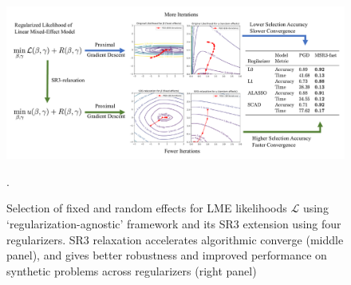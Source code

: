 \begin{figure}[ht!]
    \centering
    \includegraphics[width=\textwidth]{figures/summary_picture.pdf}
    \caption{Selection of fixed and random effects for LME likelihoods $\mathcal{L}$ using 
    `regularization-agnostic' framework and its SR3 extension using four regularizers. 
    SR3 relaxation accelerates algorithmic converge  (middle panel), and gives better robustness and improved performance on synthetic problems across regularizers (right panel)}.
    \label{fig:summary}
\end{figure}

